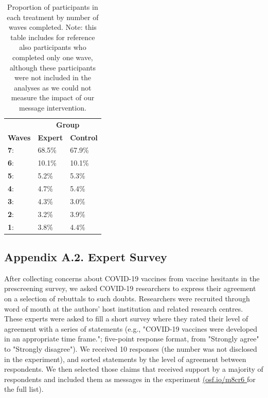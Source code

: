 \documentclass[authordate, empirical]{jote-new-article}
\begin{document}
	\clearpage
	\begin{table}[h!]
		\begin{fullwidth}
			\caption{Proportion of participants in each treatment by number of waves completed. Note: this table includes for reference also participants who completed only one wave, although these participants were not included in the analyses as we could not measure the impact of our message intervention.}
			\centering
		\begin{tabularx}{0.5\linewidth}{@{} X X X @{}}
			&\multicolumn{2}{c}{\hspace*{-3em}\textbf{Group}}\\
			\textbf{Waves}&\textbf{Expert}&\textbf{Control}\\
			\hline \textbf{7}: & 68.5\% & 67.9\% \\

			 \textbf{6}: & 10.1\% & 10.1\% \\

			 \textbf{5}: & 5.2\% & 5.3\% \\

			 \textbf{4}: & 4.7\% & 5.4\% \\

			 \textbf{3}: & 4.3\% & 3.0\% \\

			 \textbf{2}: & 3.2\% & 3.9\% \\

			 \textbf{1}: & 3.8\% & 4.4\% \\


		\end{tabularx}
	\end{fullwidth}
	\end{table}

	
	\subsection{Appendix A.2. Expert Survey}



	After collecting concerns about COVID-19 vaccines from vaccine hesitants in the prescreening survey, we asked COVID-19 researchers to express their agreement on a selection of rebuttals to such doubts. Researchers were recruited through word of mouth at the authors' host institution and related research centres. These experts were asked to fill a short survey where they rated their level of agreement with a series of statements (e.g., "COVID-19 vaccines were developed in an appropriate time frame."; five-point response format, from "Strongly agree" to "Strongly disagree"). We received 10 responses (the number was not disclosed in the experiment), and sorted statements by the level of agreement between respondents. We then selected those claims that received support by a majority of respondents and included them as messages in the experiment \href{https://osf.io/m8cr6/}{(osf.io/m8cr6 }for the full list).
\end{document}
